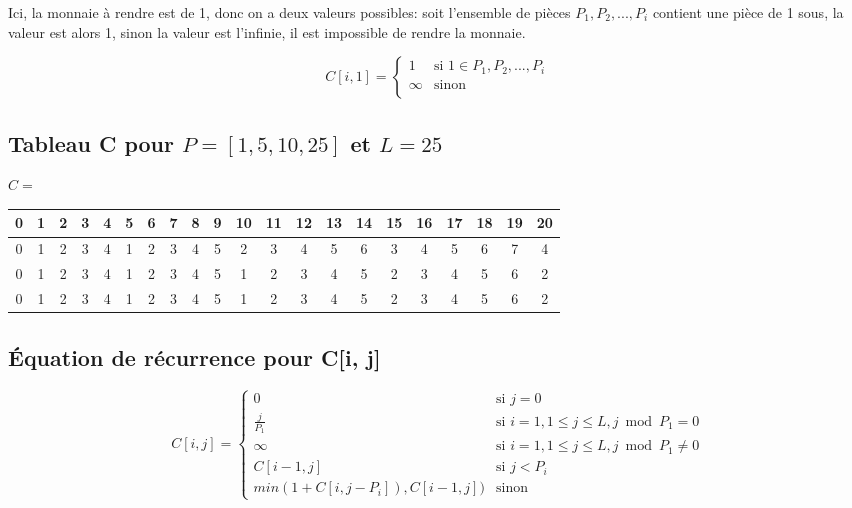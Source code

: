 \documentclass[10.9pt]{article} %
\begin{document}
Ici, la monnaie à rendre est de 1, donc on a deux valeurs possibles: soit l'ensemble de pièces
$P_1, P_2, ... , P_i$ contient une pièce de 1 sous, la valeur est alors 1, sinon la valeur est
l'infinie, il est impossible de rendre la monnaie.

\begin{equation}
C[i,1] = 
\begin{cases}
 1  &\text{si }  1 \in P_1, P_2, ... , P_i \\
 \infty                   &\text{sinon}\\
\end{cases}
\end{equation}

\subsection{Tableau C pour $P = [1, 5, 10, 25]$ et $L = 25$}

$C = $
\begin{tabular}{|c|c|c|c|c|c|c|c|c|c|c|c|c|c|c|c|c|c|c|c|c|}
\hline
 0 & 1 & 2 & 3 & 4 & 5 & 6 & 7 & 8 & 9 & 10 & 11 & 12 & 13 &14 & 15 & 16 & 17 & 18 & 19 & 20 \\ \hline
0 & 1 & 2 & 3 & 4 & 1 & 2 & 3 & 4 & 5 & 2 & 3 & 4 & 5 & 6 & 3 & 4 & 5 & 6 & 7 & 4 \\ \hline
0 & 1 & 2 & 3 & 4 & 1 & 2 & 3 & 4 & 5 & 1 & 2 & 3 & 4 & 5 & 2 & 3 & 4 & 5 & 6 & 2 \\ \hline
0 & 1 & 2 & 3 & 4 & 1 & 2 & 3 & 4 & 5 & 1 & 2 & 3 & 4 & 5 & 2 & 3 & 4 & 5 & 6 & 2 \\ \hline
\end{tabular}

\subsection{Équation de récurrence pour C[i, j]}

\begin{equation}
 C[i, j] = 
 \begin{cases}
  0 			&\text{si } j = 0 \\
  \frac{j}{P_1} 	&\text{si } i = 1, 1 \le j \le L, j \bmod P_1 = 0 \\
  \infty 		&\text{si } i = 1, 1 \le j \le L, j \bmod P_1 \neq 0 \\
  C[i-1, j]		&\text{si } j < P_i \\
  min(1 + C[i, j - P_i]), C[i-1, j])	&\text{sinon}
 \end{cases}
\end{equation}
\end{document}
